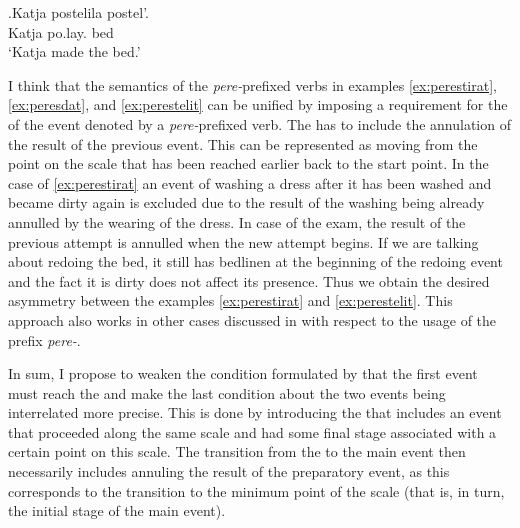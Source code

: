 \exg.\label{ex:postelit}Katja postelila postel'.\\
Katja po.lay. bed\\
\trans `Katja made the bed.'

I think that the semantics of the \textit{pere-}prefixed verbs in examples \ref{ex:perestirat}, \ref{ex:peresdat}, and \ref{ex:perestelit} can be unified by imposing a requirement for the  of the event denoted by a \textit{pere-}prefixed verb. The  has to include the annulation of the result of the previous event. This can be represented as moving from the point on the scale that has been reached earlier back to the start point. In the case of \ref{ex:perestirat} an event of washing a dress after it has been washed and became dirty again is excluded due to the result of the washing being already annulled by the wearing of the dress. In case of the exam, the result of the previous attempt is annulled when the new attempt begins. If we are talking about redoing the bed, it still has bedlinen at the beginning of the redoing event and the fact it is dirty does not affect its presence. Thus we obtain the desired asymmetry between the examples \ref{ex:perestirat} and \ref{ex:perestelit}. This approach also works in other cases discussed in \citealt{Kagan:book} with respect to the  usage of the prefix \textit{pere-}.

In sum, I propose to weaken the condition formulated by \citet{Kagan:book} that the first event must reach the  and make the last condition about the two events being interrelated more precise. This is done by introducing the  that includes an event that proceeded along the same scale and had some final stage associated with a certain point on this scale. The transition from the  to the main event then necessarily includes annuling the result of the preparatory event, as this corresponds to the transition to the minimum point of the scale (that is, in turn, the initial stage of the main event).

